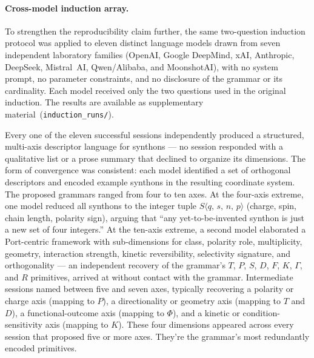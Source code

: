 \documentclass[12pt,a4paper]{article}
\begin{document}
\paragraph{Cross-model induction array.}
To strengthen the reproducibility claim further, the same two-question
induction protocol was applied to eleven distinct language models drawn
from seven independent laboratory families (OpenAI, Google DeepMind,
xAI, Anthropic, DeepSeek, Mistral~AI, Qwen/Alibaba, and
MoonshotAI), with no system prompt, no parameter constraints, and no
disclosure of the grammar or its cardinality. Each model received only
the two questions used in the original induction. The results are
available as supplementary material~(\texttt{induction\_runs/}).

Every one of the eleven successful sessions independently produced a
structured, multi-axis descriptor language for synthons --- no session
responded with a qualitative list or a prose summary that declined to
organize its dimensions. The form of convergence was consistent: each
model identified a set of orthogonal descriptors and encoded example
synthons in the resulting coordinate system. The proposed grammars
ranged from four to ten axes. At the four-axis extreme, one model
reduced all synthons to the integer tuple $S\langle q,\,s,\,n,\,p\rangle$
(charge, spin, chain length, polarity sign), arguing that ``any
yet-to-be-invented synthon is just a new set of four integers.'' At the
ten-axis extreme, a second model elaborated a Port-centric framework
with sub-dimensions for class, polarity role, multiplicity, geometry,
interaction strength, kinetic reversibility, selectivity signature, and
orthogonality --- an independent recovery of the grammar's $T$, $P$,
$S$, $D$, $F$, $K$, $\Gamma$, and $R$ primitives, arrived at without
contact with the grammar. Intermediate sessions named between five and
seven axes, typically recovering a polarity or charge axis (mapping to
$P$), a directionality or geometry axis (mapping to $T$ and $D$), a
functional-outcome axis (mapping to $\Phi$), and a kinetic or
condition-sensitivity axis (mapping to $K$). These four dimensions
appeared across every session that proposed five or more axes. They're
the grammar's most redundantly encoded primitives.
\end{document}
